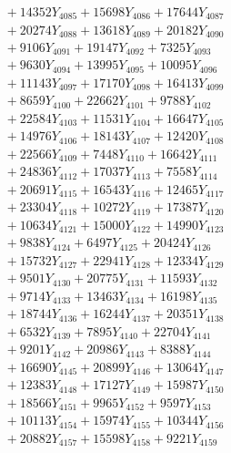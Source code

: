 \documentclass[a4paper,10pt]{article}
\begin{document}
{\begin{align}
&\;  + 14352 Y_{4085} + 15698 Y_{4086} + 17644 Y_{4087} \\[0.3ex]
&\;  + 20274 Y_{4088} + 13618 Y_{4089} + 20182 Y_{4090} \\[0.3ex]
&\;  + 9106 Y_{4091} + 19147 Y_{4092} + 7325 Y_{4093} \\[0.3ex]
&\;  + 9630 Y_{4094} + 13995 Y_{4095} + 10095 Y_{4096} \\[0.3ex]
&\;  + 11143 Y_{4097} + 17170 Y_{4098} + 16413 Y_{4099} \\[0.3ex]
&\;  + 8659 Y_{4100} + 22662 Y_{4101} + 9788 Y_{4102} \\[0.3ex]
&\;  + 22584 Y_{4103} + 11531 Y_{4104} + 16647 Y_{4105} \\[0.3ex]
&\;  + 14976 Y_{4106} + 18143 Y_{4107} + 12420 Y_{4108} \\[0.5ex]\allowbreak
&\;  + 22566 Y_{4109} + 7448 Y_{4110} + 16642 Y_{4111} \\[0.3ex]
&\;  + 24836 Y_{4112} + 17037 Y_{4113} + 7558 Y_{4114} \\[0.3ex]
&\;  + 20691 Y_{4115} + 16543 Y_{4116} + 12465 Y_{4117} \\[0.3ex]
&\;  + 23304 Y_{4118} + 10272 Y_{4119} + 17387 Y_{4120} \\[0.3ex]
&\;  + 10634 Y_{4121} + 15000 Y_{4122} + 14990 Y_{4123} \\[0.3ex]
&\;  + 9838 Y_{4124} + 6497 Y_{4125} + 20424 Y_{4126} \\[0.3ex]
&\;  + 15732 Y_{4127} + 22941 Y_{4128} + 12334 Y_{4129} \\[0.3ex]
&\;  + 9501 Y_{4130} + 20775 Y_{4131} + 11593 Y_{4132} \\[0.3ex]
&\;  + 9714 Y_{4133} + 13463 Y_{4134} + 16198 Y_{4135} \\[0.3ex]
&\;  + 18744 Y_{4136} + 16244 Y_{4137} + 20351 Y_{4138} \\[0.5ex]\allowbreak
&\;  + 6532 Y_{4139} + 7895 Y_{4140} + 22704 Y_{4141} \\[0.3ex]
&\;  + 9201 Y_{4142} + 20986 Y_{4143} + 8388 Y_{4144} \\[0.3ex]
&\;  + 16690 Y_{4145} + 20899 Y_{4146} + 13064 Y_{4147} \\[0.3ex]
&\;  + 12383 Y_{4148} + 17127 Y_{4149} + 15987 Y_{4150} \\[0.3ex]
&\;  + 18566 Y_{4151} + 9965 Y_{4152} + 9597 Y_{4153} \\[0.3ex]
&\;  + 10113 Y_{4154} + 15974 Y_{4155} + 10344 Y_{4156} \\[0.3ex]
&\;  + 20882 Y_{4157} + 15598 Y_{4158} + 9221 Y_{4159} \\[0.3ex]

\end{align}}
\end{document}
